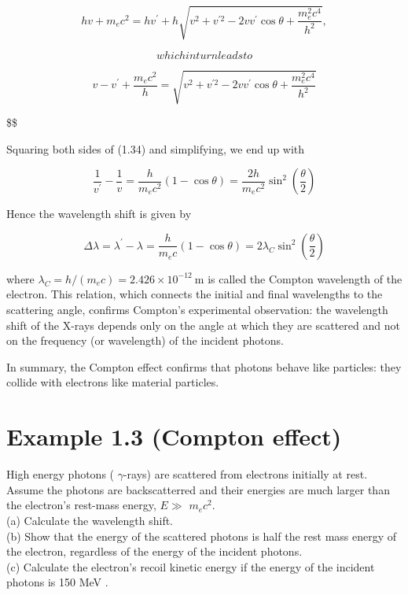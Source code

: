 \documentclass[10pt]{article}
\begin{document}
\begin{equation*}
h v+m_{e} c^{2}=h v^{\prime}+h \sqrt{v^{2}+v^{\prime 2}-2 v v^{\prime} \cos \theta+\frac{m_{e}^{2} c^{4}}{h^{2}}}, \tag{1.33}
\end{equation*}

$$
which in turn leads to
$$

\begin{equation*}
v-v^{\prime}+\frac{m_{e} c^{2}}{h}=\sqrt{v^{2}+v^{\prime 2}-2 v v^{\prime} \cos \theta+\frac{m_{e}^{2} c^{4}}{h^{2}}} \tag{1.34}
\end{equation*}

\$\$

Squaring both sides of (1.34) and simplifying, we end up with


\begin{equation*}
\frac{1}{v^{\prime}}-\frac{1}{v}=\frac{h}{m_{e} c^{2}}(1-\cos \theta)=\frac{2 h}{m_{e} c^{2}} \sin ^{2}\left(\frac{\theta}{2}\right) \tag{1.35}
\end{equation*}


Hence the wavelength shift is given by


\begin{equation*}
\Delta \lambda=\lambda^{\prime}-\lambda=\frac{h}{m_{e} c}(1-\cos \theta)=2 \lambda_{C} \sin ^{2}\left(\frac{\theta}{2}\right) \tag{1.36}
\end{equation*}


where $\lambda_{C}=h /\left(m_{e} c\right)=2.426 \times 10^{-12} \mathrm{~m}$ is called the Compton wavelength of the electron. This relation, which connects the initial and final wavelengths to the scattering angle, confirms Compton's experimental observation: the wavelength shift of the X-rays depends only on the angle at which they are scattered and not on the frequency (or wavelength) of the incident photons.

In summary, the Compton effect confirms that photons behave like particles: they collide with electrons like material particles.

\section*{Example 1.3 (Compton effect)}
High energy photons ( $\gamma$-rays) are scattered from electrons initially at rest. Assume the photons are backscatterred and their energies are much larger than the electron's rest-mass energy, $E \gg$ $m_{e} c^{2}$.\\
(a) Calculate the wavelength shift.\\
(b) Show that the energy of the scattered photons is half the rest mass energy of the electron, regardless of the energy of the incident photons.\\
(c) Calculate the electron's recoil kinetic energy if the energy of the incident photons is 150 MeV .
\end{document}
